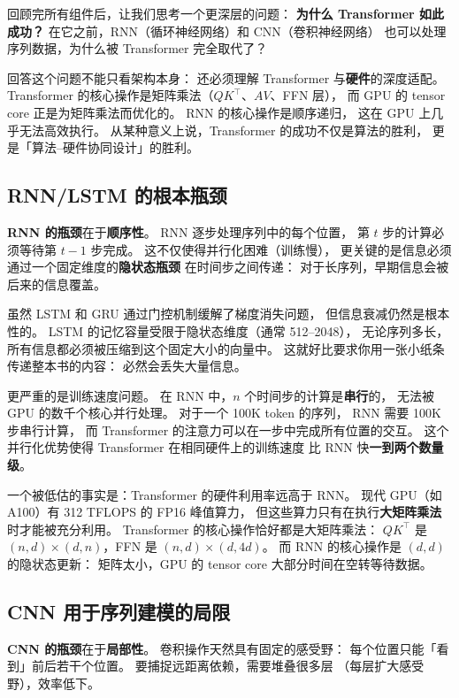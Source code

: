 回顾完所有组件后，让我们思考一个更深层的问题：
\textbf{为什么 Transformer 如此成功？}
在它之前，RNN（循环神经网络）和 CNN（卷积神经网络）
也可以处理序列数据，为什么被 Transformer 完全取代了？

回答这个问题不能只看架构本身：
还必须理解 Transformer 与\textbf{硬件}的深度适配。
Transformer 的核心操作是矩阵乘法（$QK^\top$、$AV$、FFN 层），
而 GPU 的 tensor core 正是为矩阵乘法而优化的。
RNN 的核心操作是顺序递归，
这在 GPU 上几乎无法高效执行。
从某种意义上说，Transformer 的成功不仅是算法的胜利，
更是「算法--硬件协同设计」的胜利。

\subsection{RNN/LSTM 的根本瓶颈}

\textbf{RNN 的瓶颈}在于\textbf{顺序性}。
RNN 逐步处理序列中的每个位置，
第 $t$ 步的计算必须等待第 $t-1$ 步完成。
这不仅使得并行化困难（训练慢），
更关键的是信息必须通过一个固定维度的\textbf{隐状态瓶颈}
在时间步之间传递：
对于长序列，早期信息会被后来的信息覆盖。

虽然 LSTM 和 GRU 通过门控机制缓解了梯度消失问题，
但信息衰减仍然是根本性的。
LSTM 的记忆容量受限于隐状态维度（通常 512--2048），
无论序列多长，所有信息都必须被压缩到这个固定大小的向量中。
这就好比要求你用一张小纸条传递整本书的内容：
必然会丢失大量信息。

更严重的是训练速度问题。
在 RNN 中，$n$ 个时间步的计算是\textbf{串行}的，
无法被 GPU 的数千个核心并行处理。
对于一个 100K token 的序列，
RNN 需要 100K 步串行计算，
而 Transformer 的注意力可以在一步中完成所有位置的交互。
这个并行化优势使得 Transformer 在相同硬件上的训练速度
比 RNN 快\textbf{一到两个数量级}。

一个被低估的事实是：Transformer 的硬件利用率远高于 RNN。
现代 GPU（如 A100）有 312 TFLOPS 的 FP16 峰值算力，
但这些算力只有在执行\textbf{大矩阵乘法}时才能被充分利用。
Transformer 的核心操作恰好都是大矩阵乘法：
$QK^\top$ 是 $(n, d) \times (d, n)$，FFN 是 $(n, d) \times (d, 4d)$。
而 RNN 的核心操作是 $(d, d)$ 的隐状态更新：
矩阵太小，GPU 的 tensor core 大部分时间在空转等待数据。

\subsection{CNN 用于序列建模的局限}

\textbf{CNN 的瓶颈}在于\textbf{局部性}。
卷积操作天然具有固定的感受野：
每个位置只能「看到」前后若干个位置。
要捕捉远距离依赖，需要堆叠很多层
（每层扩大感受野），效率低下。

